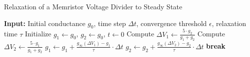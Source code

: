\documentclass[reprint,superscriptaddress,prb,showkeys]{revtex4-2}
\begin{document}
\begin{algorithm}
    \label{alg:relaxation}
    \caption{Relaxation of a Memristor Voltage Divider to Steady State}
    \begin{algorithmic}[1]
    \State \textbf{Input:} Initial conductance $g_0$, time step $\Delta t$, convergence threshold $\epsilon$, relaxation time $\tau$
    \State Initialize $g_1 \gets g_0$, $g_2 \gets g_0$, $t \gets 0$
        \State Compute $\Delta V_1 \gets \frac{5 \cdot g_2}{g_1 + g_2}$
        \State Compute $\Delta V_2 \gets \frac{5 \cdot g_1}{g_1 + g_2}$
        \State $g_1 \gets g_1 + \frac{g_{\infty}(\Delta V_1) - g_1}{\tau} \cdot \Delta t$
        \State $g_2 \gets g_2 + \frac{g_{\infty}(\Delta V_2) - g_2}{\tau} \cdot \Delta t$
            \State \textbf{break}
        \EndIf
    \EndWhile
    \end{algorithmic}
\end{algorithm}
\end{document}
